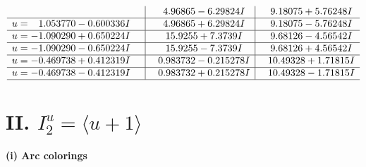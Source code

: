 \documentclass[1p]{elsarticle_modified}
\theoremstyle{definition}
\begin{document}
$$\begin{array}{c|c|c}
 & \phantom{-}4.96865 - 6.29824 I & \phantom{-}9.18075 + 5.76248 I \\ \hline\begin{aligned}
u &= \phantom{-}1.053770 - 0.600336 I\end{aligned}
 & \phantom{-}4.96865 + 6.29824 I & \phantom{-}9.18075 - 5.76248 I \\ \hline\begin{aligned}
u &= -1.090290 + 0.650224 I\end{aligned}
 & \phantom{-}15.9255 + 7.3739 I & \phantom{-}9.68126 - 4.56542 I \\ \hline\begin{aligned}
u &= -1.090290 - 0.650224 I\end{aligned}
 & \phantom{-}15.9255 - 7.3739 I & \phantom{-}9.68126 + 4.56542 I \\ \hline\begin{aligned}
u &= -0.469738 + 0.412319 I\end{aligned}
 & \phantom{-}0.983732 - 0.215278 I & \phantom{-}10.49328 + 1.71815 I \\ \hline\begin{aligned}
u &= -0.469738 - 0.412319 I\end{aligned}
 & \phantom{-}0.983732 + 0.215278 I & \phantom{-}10.49328 - 1.71815 I\\
 \hline 
 \end{array}$$\newpage\newpage\renewcommand{\arraystretch}{1}
\centering \section*{II. $I^u_{2}= \langle u+1 \rangle$}
\flushleft \textbf{(i) Arc colorings}\\
\end{document}
